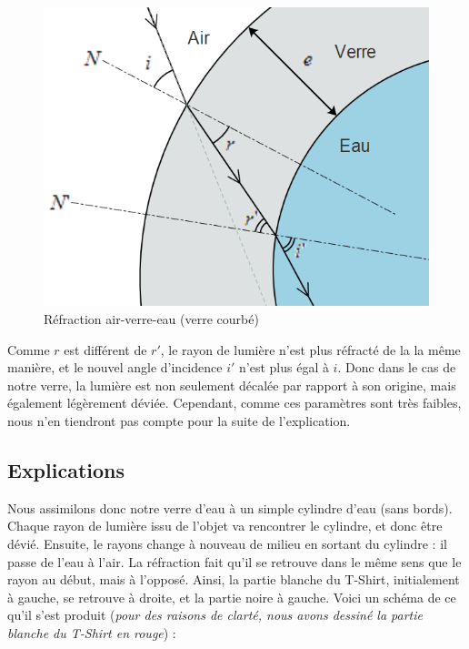 \documentclass[a4paper, 12pt, onecolumn, openany]{report}
\begin{document}
	\begin{figure}[h]
	\begin{center}
	\includegraphics[scale=0.5]{refraction-theorie2.png}
	\end{center}
	\caption{Réfraction air-verre-eau (verre courbé)}
	\label{Réfraction air-verre-air (verre droit)}
	\end{figure}
	
	Comme $r$ est différent de $r'$, le rayon de lumière n'est plus réfracté de la la même manière, et le nouvel angle d'incidence $i'$ n'est plus égal à $i$. Donc dans le cas de notre verre, la lumière est non seulement décalée par rapport à son origine, mais également légèrement déviée. Cependant, comme ces paramètres sont très faibles, nous n'en tiendront pas compte pour la suite de l'explication.
	
	\newpage
	\subsection{Explications}
	
	Nous assimilons donc notre verre d'eau à un simple cylindre d'eau (sans bords). Chaque rayon de lumière issu de l'objet va rencontrer le cylindre, et donc être dévié. Ensuite, le rayons change à nouveau de milieu en sortant du cylindre : il passe de l'eau à l'air. La réfraction fait qu'il se retrouve dans le même sens que le rayon au début, mais à l'opposé. Ainsi, la partie blanche du T-Shirt, initialement à gauche, se retrouve à droite, et la partie noire à gauche. Voici un schéma de ce qu'il s'est produit (\textit{pour des raisons de clarté, nous avons dessiné la partie blanche du T-Shirt en rouge}) :
	
\end{document}

